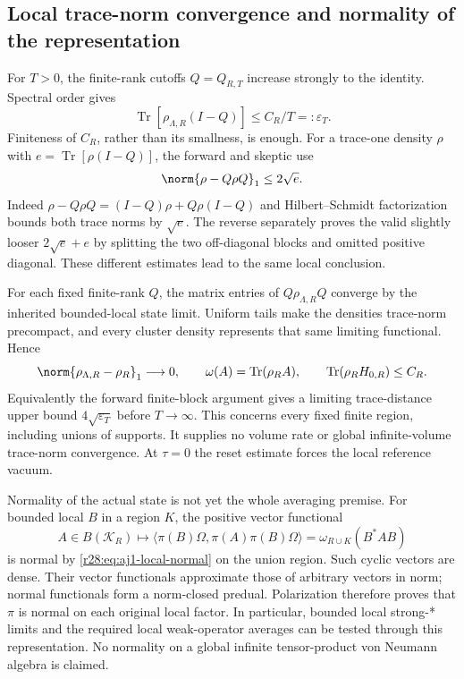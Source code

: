 \subsection{Local trace-norm convergence and normality of the representation}
For $T>0$, the finite-rank cutoffs $Q=Q_{R,T}$ increase strongly to the identity. Spectral order gives
\begin{equation}
 \operatorname{Tr}[\rho_{\Lambda,R}(I-Q)]\le C_R/T=:\varepsilon_T.
 \label{r28:eq:aj1-tightness}
\end{equation}
Finiteness of $C_R$, rather than its smallness, is enough. For a trace-one density $\rho$ with $e=\operatorname{Tr}[\rho(I-Q)]$, the forward and skeptic use
\begin{equation}
 \norm{\rho-Q\rho Q}_1\le2\sqrt e.
 \label{r28:eq:aj1-trace-tail}
\end{equation}
Indeed $\rho-Q\rho Q=(I-Q)\rho+Q\rho(I-Q)$ and Hilbert--Schmidt factorization bounds both trace norms by $\sqrt e$. The reverse separately proves the valid slightly looser $2\sqrt e+e$ by splitting the two off-diagonal blocks and omitted positive diagonal. These different estimates lead to the same local conclusion.

For each fixed finite-rank $Q$, the matrix entries of $Q\rho_{\Lambda,R}Q$ converge by the inherited bounded-local state limit. Uniform tails make the densities trace-norm precompact, and every cluster density represents that same limiting functional. Hence
\begin{equation}
 \norm{\rho_{\Lambda,R}-\rho_R}_1\longrightarrow0,
 \qquad\omega(A)=\operatorname{Tr}(\rho_RA),
 \qquad\operatorname{Tr}(\rho_RH_{0,R})\le C_R.
 \label{r28:eq:aj1-local-normal}
\end{equation}
Equivalently the forward finite-block argument gives a limiting trace-distance upper bound $4\sqrt{\varepsilon_T}$ before $T\to\infty$. This concerns every fixed finite region, including unions of supports. It supplies no volume rate or global infinite-volume trace-norm convergence. At $\tau=0$ the reset estimate forces the local reference vacuum.

Normality of the actual state is not yet the whole averaging premise. For bounded local $B$ in a region $K$, the positive vector functional
\begin{equation}
 A\in B(\mathcal K_R)\longmapsto
 \langle\pi(B)\Omega,\pi(A)\pi(B)\Omega\rangle
 =\omega_{R\cup K}(B^*AB)
\end{equation}
is normal by \eqref{r28:eq:aj1-local-normal} on the union region. Such cyclic vectors are dense. Their vector functionals approximate those of arbitrary vectors in norm; normal functionals form a norm-closed predual. Polarization therefore proves that $\pi$ is normal on each original local factor. In particular, bounded local strong-* limits and the required local weak-operator averages can be tested through this representation. No normality on a global infinite tensor-product von Neumann algebra is claimed.

